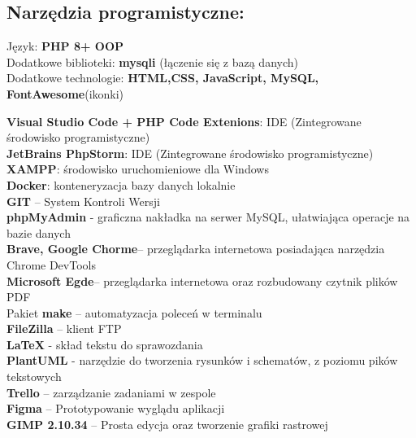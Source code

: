 \subsection{Narzędzia programistyczne:}
    \begin{flushleft}
        Język: \textbf{PHP 8+ OOP} \\
        Dodatkowe biblioteki: \textbf{mysqli} (łączenie się z bazą danych)\\
        Dodatkowe technologie: \textbf{HTML,CSS, JavaScript, MySQL, FontAwesome}(ikonki) \newline\newline

        \textbf{Visual Studio Code + PHP Code Extenions}: IDE (Zintegrowane środowisko programistyczne)\\
        \textbf{JetBrains PhpStorm}: IDE (Zintegrowane środowisko programistyczne)\\
        \textbf{XAMPP}: środowisko uruchomieniowe dla Windows \\
        \textbf{Docker}: konteneryzacja bazy danych lokalnie\\
        \textbf{GIT} – System Kontroli Wersji\\
        \textbf{phpMyAdmin} - graficzna nakładka na serwer MySQL, ułatwiająca operacje na bazie danych\\
        \textbf{Brave, Google Chorme}– przeglądarka internetowa posiadająca narzędzia Chrome DevTools \\
        \textbf{Microsoft Egde}– przeglądarka internetowa oraz rozbudowany czytnik plików PDF \\
        Pakiet \textbf{make} – automatyzacja poleceń w terminalu\\
        \textbf{FileZilla} – klient FTP\\
        \textbf{LaTeX} - skład tekstu do sprawozdania\\
        \textbf{PlantUML} - narzędzie do tworzenia rysunków i schematów, z poziomu pików tekstowych\\
        \textbf{Trello} – zarządzanie zadaniami w zespole\\
        \textbf{Figma} – Prototypowanie wyglądu aplikacji \\
        \textbf{GIMP 2.10.34} – Prosta edycja oraz tworzenie grafiki rastrowej \\


    \end{flushleft}
\pagebreak

